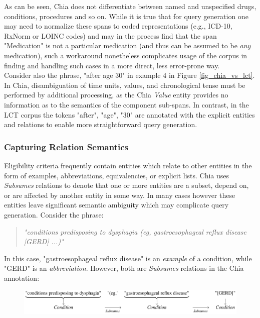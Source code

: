 \documentclass[../main.tex]{subfiles}
\begin{document}
\noindent As can be seen, Chia does not differentiate between named and unspecified drugs, conditions, procedures and so on. While it is true that for query generation one may need to normalize these spans to coded representations (e.g., ICD-10, RxNorm or LOINC codes) and may in the process find that the span "Medication" is not a particular medication (and thus can be assumed to be \textit{any} medication), such a workaround nonetheless complicates usage of the corpus in finding and handling such cases in a more direct, less error-prone way. \\

\noindent Consider also the phrase, "after age 30" in example 4 in Figure \ref{fig_chia_vs_lct}. In Chia, disambiguation of time units, values, and chronological tense must be performed by additional processing, as the Chia \textit{Value} entity provides no information as to the semantics of the component sub-spans. In contrast, in the LCT corpus the tokens "after", "age", "30" are annotated with the explicit entities and relations to enable more straightforward query generation. \\

\subsubsection{Capturing Relation Semantics}
Eligibility criteria frequently contain entities which relate to other entities in the form of examples, abbreviations, equivalencies, or explicit lists. Chia uses \textit{Subsumes} relations to denote that one or more entities are a subset, depend on, or are affected by another entity in some way. In many cases however these entities leave significant semantic ambiguity which may complicate query generation. Consider the phrase:

\begin{quote} 
\centering 
\textit{"conditions predisposing to dysphagia (eg, gastroesophageal reflux disease [GERD] ...)"}
\end{quote} 

In this case, "gastroesophageal reflux disease" is an \textit{example} of a condition, while "GERD" is an \textit{abbreviation}. However, both are \textit{Subsumes} relations in the Chia annotation:

\begin{figure}[H]
  \includegraphics[scale=0.48]{Figures/3_lct_corpus/lct_latex_fig1.png} 
\label{fig_lct_latex1}
\end{figure}
\end{document}
